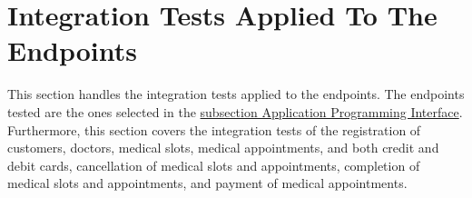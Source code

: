 \section{Integration Tests Applied To The Endpoints}

This section handles the integration tests applied to the endpoints. The endpoints tested are the ones selected in the \hyperref[subsection:api]{subsection Application Programming Interface}. Furthermore, this section covers the integration tests of the registration of customers, doctors, medical slots, medical appointments, and both credit and debit cards, cancellation of medical slots and appointments, completion of medical slots and appointments, and payment of medical appointments.

